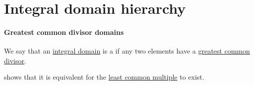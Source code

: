 \section{Integral domain hierarchy}\label{sec:integral_domain_hierarchy}

\paragraph{Greatest common divisor domains}

\begin{definition}\label{def:gcd_domain}
  We say that an \hyperref[def:integral_domain]{integral domain} is a  if any two elements have a \hyperref[def:gcd]{greatest common divisor}.

   shows that it is equivalent for the \hyperref[def:lcm]{least common multiple} to exist.
\end{definition}

